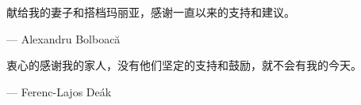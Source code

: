 ﻿献给我的妻子和搭档玛丽亚，感谢一直以来的支持和建议。

\begin{flushright}
--- Alexandru Bolboacă
\end{flushright}


衷心的感谢我的家人，没有他们坚定的支持和鼓励，就不会有我的今天。

\begin{flushright}
--- Ferenc-Lajos Deák
\end{flushright}
